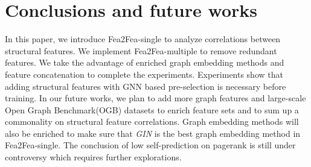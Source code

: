 \documentclass[runningheads]{llncs}
\begin{document}
\section{Conclusions and future works}
\vspace{-0.4cm}
In this paper, we introduce Fea2Fea-single to analyze correlations between structural features. We implement Fea2Fea-multiple to remove redundant features. We take the advantage of enriched graph embedding methods and feature concatenation to complete the experiments. Experiments show that adding structural features with GNN based pre-selection is necessary before training. In our future works, we plan to add more graph features and large-scale Open Graph Benchmark(OGB) datasets to enrich feature sets and to sum up a commonality on structural feature correlations. Graph embedding methods will also be enriched
to make sure that \textit{GIN} is the best graph embedding method in Fea2Fea-single. 
The conclusion of low self-prediction on pagerank is still under controversy which requires further explorations.






\appendix
\newpage
\end{document}
